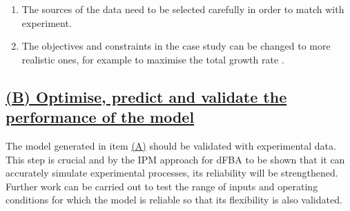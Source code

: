\documentclass[11pt,a4paper,english]{article}
\begin{document}
\begin{enumerate}
\item
The sources of the data need to be selected carefully in order to match with experiment.
\item
The objectives and constraints in the case study can be changed to more realistic ones, for example to maximise the total growth rate \citep{henson2014dynamic}.
\end{enumerate}

\subsection*{\underline{(B) Optimise, predict and validate the performance of the model}}
\label{sec:subsecB}
The model generated in item \hyperref[sec:subsecA]{(A)} should be validated with experimental data. This step is crucial and by the IPM approach for dFBA to be shown that it can accurately simulate experimental processes, its reliability will be strengthened. Further work can be carried out to test the range of inputs and operating conditions for which the model is reliable so that its flexibility is also validated.
\end{document}
